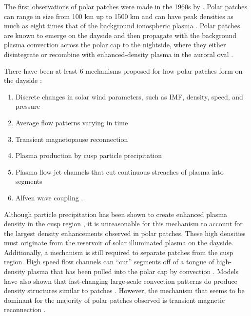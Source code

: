 The first observations of polar patches were made in the 1960s by \citet{Hill1963}.  Polar patches can range in size from 100 km up to 1500 km and can have peak densities as much as eight times that of the background ionospheric plasma \citep{Weber1986,Hosokawa2014}.  Polar patches are known to emerge on the dayside and then propagate with the background plasma convection across the polar cap to the nightside, where they either disintegrate or recombine with enhanced-density plasma in the auroral oval \citep{Weber1985,Weber1986}.

There have been at least 6 mechanisms proposed for how polar patches form on the dayside \citep{Crowley1996,Carlson2012}:
\begin{enumerate}
	\item Discrete changes in solar wind parameters, such as IMF, density, speed, and pressure \citep{Sojka1994}
	\item Average flow patterns varying in time \citep{Anderson1988}
	\item Transient magnetopause reconnection \citep{Lockwood1992b}
	\item Plasma production by cusp particle precipitation \citep{Rodger1994,Millward1999}
	\item Plasma flow jet channels that cut continuous streaches of plasma into segments 	\citep{Valladares1998}
	\item Alfven wave coupling \citep{Prikryl1999}.
\end{enumerate}
Although particle precipitation has been shown to create enhanced plasma density in the cusp region \citep{Rodger1994}, it is unreasonable for this mechanism to account for the largest density enhancements observed in polar patches.  These high densities must originate from the reservoir of solar illuminated plasma on the dayside.  Additionally, a mechanism is still required to separate patches from the cusp region.  High speed flow channels can ``cut'' segments off of a tongue of high-density plasma that has been pulled into the polar cap by convection \citep{Valladares1994,Valladares1998}.  Models have also shown that fast-changing large-scale convection patterns do produce density structures similar to patches \citep{Anderson1988}.  However, the mechanism that seems to be dominant for the majority of polar patches observed is transient magnetic reconnection \citep{Carlson2012}.

